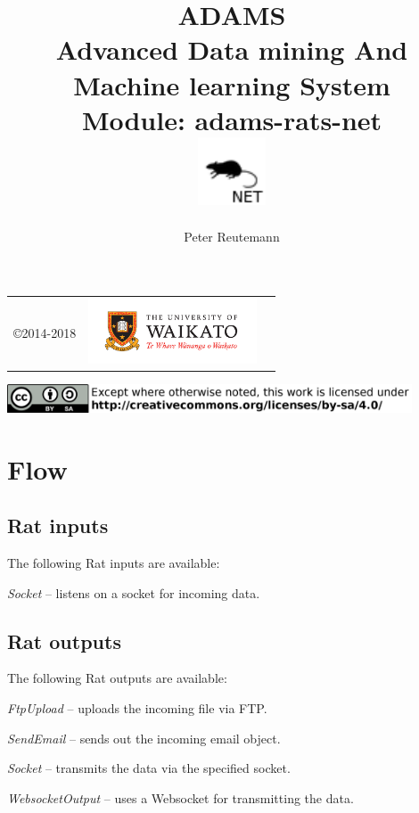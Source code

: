 \documentclass[a4paper]{book}
\title{
  \textbf{ADAMS} \\
  {\Large \textbf{A}dvanced \textbf{D}ata mining \textbf{A}nd \textbf{M}achine
  learning \textbf{S}ystem} \\
  {\Large Module: adams-rats-net} \\
  \vspace{1cm}
  \includegraphics[width=2cm]{images/rats-net-module.png} \\
}
\author{
  Peter Reutemann
}
\begin{document}
\begin{titlepage}
\maketitle

\thispagestyle{empty}
\center
\begin{table}[b]
	\begin{tabular}{c l l}
		\parbox[c][2cm]{2cm}{\copyright 2014-2018} &
		\parbox[c][2cm]{5cm}{\includegraphics[width=5cm]{images/coat_of_arms.pdf}}
	\end{tabular}
	\includegraphics[width=12cm]{images/cc.png} \\
\end{table}

\end{titlepage}

\tableofcontents

\chapter{Flow}

\section{Rat inputs}
The following Rat inputs are available:
\begin{tight_itemize}
  \item \textit{Socket} -- listens on a socket for incoming data.
\end{tight_itemize}

\section{Rat outputs}
The following Rat outputs are available:
\begin{tight_itemize}
  \item \textit{FtpUpload} -- uploads the incoming file via FTP.
  \item \textit{SendEmail} -- sends out the incoming email object.
  \item \textit{Socket} -- transmits the data via the specified socket.
  \item \textit{WebsocketOutput} -- uses a Websocket\cite{websocket} for transmitting the data.
\end{tight_itemize}


\end{document}
